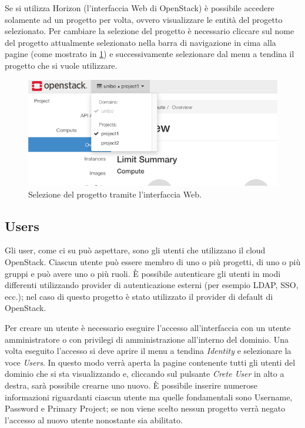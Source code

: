 \noindent
Se si utilizza Horizon (l'interfaccia Web di OpenStack) è possibile accedere solamente ad un progetto per volta, ovvero visualizzare le entità del progetto selezionato. Per cambiare la selezione del progetto è necessario cliccare sul nome del progetto attualmente selezionato nella barra di navigazione in cima alla pagine (come mostrato in \cref{fig:openstack_project_selection}) e successivamente selezionare dal menu a tendina il progetto che si vuole utilizzare.

\begin{figure}[H]
    \center
    \includegraphics[width=0.9\linewidth]{tesi/files/immagini/openstack_usage/openstack_project_switch.png}
    \caption{Selezione del progetto tramite l'interfaccia Web.}
    \label{fig:openstack_project_selection}
\end{figure}

\subsection{Users}

Gli user, come ci su può aspettare, sono gli utenti che utilizzano il cloud OpenStack. Ciascun utente può essere membro di uno o più progetti, di uno o più gruppi e può avere uno o più ruoli. È possibile autenticare gli utenti in modi differenti utilizzando provider di autenticazione esterni (per esempio LDAP, SSO, ecc.); nel caso di questo progetto è stato utilizzato il provider di default di OpenStack.

Per creare un utente è necessario eseguire l'accesso all'interfaccia con un utente amministratore o con privilegi di amministrazione all'interno del dominio. Una volta eseguito l'accesso si deve aprire il menu a tendina \textit{Identity} e selezionare la voce \textit{Users}. In questo modo verrà aperta la pagine contenente tutti gli utenti del dominio che si sta visualizzando e, cliccando sul pulsante \textit{Crete User} in alto a destra, sarà possibile crearne uno nuovo. È possibile inserire numerose informazioni riguardanti ciascun utente ma quelle fondamentali sono Username, Password e Primary Project; se non viene scelto nessun progetto verrà negato l'accesso al nuovo utente nonostante sia abilitato.

